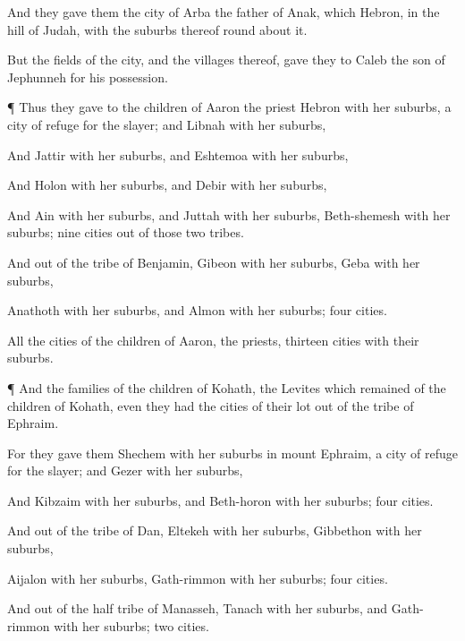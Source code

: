 {And they
gave them the
city of
Arba the
father of
Anak, which
{}
Hebron, in the
hill
{} of
Judah, with the
suburbs thereof round
about it.

But the
fields of the
city, and the
villages thereof,
gave they to
Caleb the
son of
Jephunneh for his
possession.


\par }{\PP {}¶ Thus they
gave to the
children of
Aaron the
priest
Hebron with her
suburbs,
{} a
city of
refuge for the
slayer; and
Libnah with her
suburbs,

And
Jattir with her
suburbs, and
Eshtemoa with her
suburbs,

And
Holon with her
suburbs, and
Debir with her
suburbs,

And
Ain with her
suburbs, and
Juttah with her
suburbs,
{}
Beth-shemesh with her
suburbs;
nine
cities out of those
two
tribes.

And out of the
tribe of
Benjamin,
Gibeon with her
suburbs,
Geba with her
suburbs,

Anathoth with her
suburbs, and
Almon with her
suburbs;
four
cities.

All the
cities of the
children of
Aaron, the
priests,
{}
thirteen
cities with their
suburbs.


\par }{\PP {}¶ And the
families of the
children of
Kohath, the
Levites which
remained of the
children of
Kohath, even they had the
cities of their
lot out of the
tribe of
Ephraim.

For they
gave them
Shechem with her
suburbs in
mount
Ephraim,
{} a
city of
refuge for the
slayer; and
Gezer with her
suburbs,

And
Kibzaim with her
suburbs, and
Beth-horon with her
suburbs;
four
cities.

And out of the
tribe of
Dan,
Eltekeh with her
suburbs,
Gibbethon with her
suburbs,

Aijalon with her
suburbs,
Gath-rimmon with her
suburbs;
four
cities.

And out of the
half
tribe of
Manasseh,
Tanach with her
suburbs, and
Gath-rimmon with her
suburbs;
two
cities.

}
